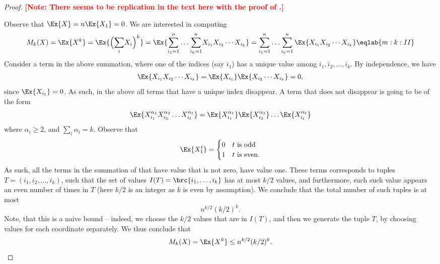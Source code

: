 \begin{proof}
    \textbf{\textcolor{red}{[Note: There seems to be replication in the text here with the proof of .]}}

    Observe that $\Ex{X} = n \Ex{X_1} = 0$.  We are interested in
    computing
    \begin{equation}
        M_k(X)%
        =%
        \Ex{  X^{k}}%
        =%
        \Ex{  \Bigl(\smash{\sum_i} X_i \Bigr)^{k}}%
        =%
        \Ex{\Bigl. \smash{\sum_{i_1=1}^n}  \ldots \smash{\sum_{i_k=1}^n}  X_{i_1} X_{i_2} \cdots
           X_{i_k} }%
        =%
        \sum_{i_1=1}^n  \ldots \sum_{i_k=1}^n
        \Ex{X_{i_1} X_{i_2} \cdots
           X_{i_k} }%
        \eqlab{m:k:II}
    \end{equation}
    Consider a term in the above summation, where one of the indices
    (say $i_1$) has a unique value among $i_1, i_2, \ldots, i_k$. By
    independence, we have
    \begin{align*}
      \Ex{X_{i_1} X_{i_2} \cdots X_{i_k} }
      =
      \Ex{X_{i_1}}\Ex{ X_{i_2} \cdots X_{i_k} } = 0,
    \end{align*}
    since $\Ex{X_{i_1}} = 0$.  As such, in the above all terms that
    have a unique index disappear. A term that does not disappear is
    going to be of the form
    \begin{equation*}
        \Ex{X_{i_1}^{\alpha_1} X_{i_2}^{\alpha_2} \ldots
           X_{i_\ell}^{\alpha_\ell}}
        =%
        \Ex{X_{i_1}^{\alpha_1}}\Ex{ X_{i_2}^{\alpha_2}} \ldots
        \Ex{ X_{i_\ell}^{\alpha_\ell}}
    \end{equation*}
    where $\alpha_i \geq 2$, and $\sum_i \alpha_i = k$. Observe that
    \[
        \Ex{X_1^t} =\begin{cases}
            0 & t \text{ is odd}\\
            1 & t \text{ is even.}
        \end{cases}
    \]
    As such, all the terms in the summation of  that have
    value that is not zero, have value one. These terms corresponds to
    tuples $T = (i_1, i_2, \ldots, i_k)$, such that the set of values
    $I(T) = \brc{ i_1, \ldots, i_k}$ has at most $k/2$ values, and
    furthermore, each such value appears an even number of times in
    $T$ (here $k/2$ is an integer as $k$ is even by assumption). We
    conclude that the total number of such tuples is at most
    \[
        n^{k/2} (k/2)^k.
    \]
    Note, that this is a naive bound -- indeed, we choose the $k/2$
    values that are in $I(T)$, and then we generate the tuple $T$, by
    choosing values for each coordinate separately. We thus conclude
    that
    \begin{equation*}
        M_k(X) = \Ex{  X^{k}}%
        \leq n^{k/2} (k/2)^k.
    \end{equation*}


\end{proof}
